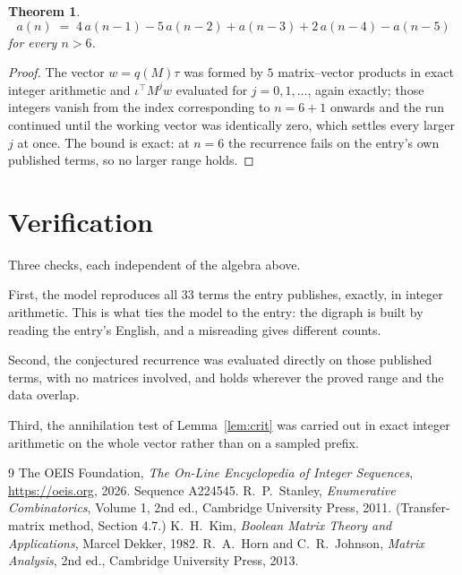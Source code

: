\documentclass[11pt,a4paper]{article}
\theoremstyle{plain}
\newtheorem{theorem}{Theorem}
\theoremstyle{definition}
\begin{document}
\begin{theorem}
\[
a(n)\;=\;4\,a(n-1) - 5\,a(n-2) + a(n-3) + 2\,a(n-4) - a(n-5)
\]
for every $n>6$.
\end{theorem}

\begin{proof}
The vector $w=q(M)\tau$ was formed by $5$ matrix--vector products in exact integer
arithmetic and $\iota^{\!\top}M^{j}w$ evaluated for $j=0,1,\dots$, again exactly; those
integers vanish from the index corresponding to $n=6+1$ onwards and the run continued
until the working vector was identically zero, which settles every larger $j$ at once. The bound is exact: at $n=6$ the recurrence fails on the entry's own published terms, so no larger range holds.
\end{proof}

\section{Verification}

Three checks, each independent of the algebra above.

First, the model reproduces all $33$ terms the entry publishes, exactly, in integer
arithmetic. This is what ties the model to the entry: the digraph is built by reading the
entry's English, and a misreading gives different counts.

Second, the conjectured recurrence was evaluated directly on those published terms, with no
matrices involved, and holds wherever the proved range and the data overlap.

Third, the annihilation test of Lemma~\ref{lem:crit} was carried out in exact integer
arithmetic on the whole vector rather than on a sampled prefix.

\begin{thebibliography}{9}
 The OEIS Foundation, \emph{The On-Line Encyclopedia of Integer
Sequences}, \url{https://oeis.org}, 2026. Sequence A224545.
 R.~P.~Stanley, \emph{Enumerative Combinatorics}, Volume 1, 2nd ed.,
Cambridge University Press, 2011. (Transfer-matrix method, Section 4.7.)
 K.~H.~Kim, \emph{Boolean Matrix Theory and Applications}, Marcel Dekker,
1982.
 R.~A.~Horn and C.~R.~Johnson, \emph{Matrix Analysis}, 2nd ed., Cambridge
University Press, 2013.
\end{thebibliography}
\end{document}
